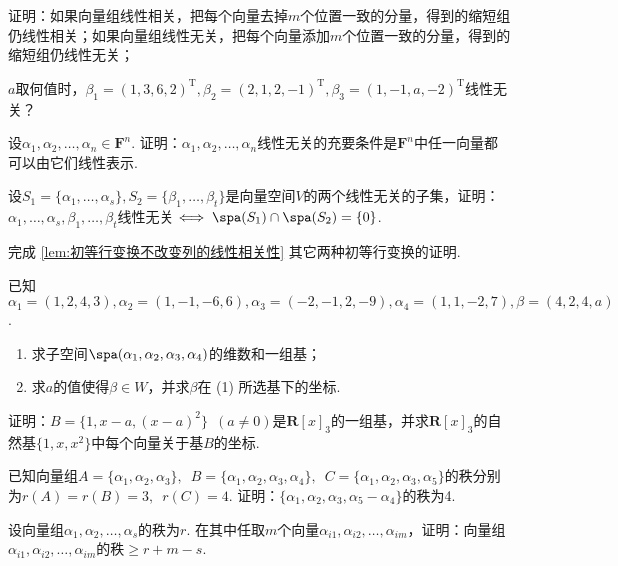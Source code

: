 \begin{exercise}
\begin{exgroup}
\begin{enumerate}
        \end{enumerate}

        \item 证明：如果向量组线性相关，把每个向量去掉$m$个位置一致的分量，得到的缩短组仍线性相关；如果向量组线性无关，把每个向量添加$m$个位置一致的分量，得到的缩短组仍线性无关；

        \item $a$取何值时，$\beta_1=(1,3,6,2)^\mathrm{T},\beta_2=(2,1,2,-1)^\mathrm{T},\beta_3=(1,-1,a,-2)^\mathrm{T}$线性无关？

        \item 设$\alpha_1,\alpha_2,\ldots,\alpha_n\in\mathbf{F}^n$. 证明：$\alpha_1,\alpha_2,\ldots,\alpha_n$线性无关的充要条件是$\mathbf{F}^n$中任一向量都可以由它们线性表示.

        \item 设$S_1=\{\alpha_1,\ldots,\alpha_s\},S_2=\{\beta_1,\ldots,\beta_t\}$是向量空间$V$的两个线性无关的子集，证明：$\alpha_1,\ldots,\alpha_s,\beta_1,\ldots,\beta_t$线性无关$\iff \spa(S_1)\cap \spa(S_2)=\{0\}$.

        \item 完成 \autoref{lem:初等行变换不改变列的线性相关性} 其它两种初等行变换的证明.

        \item 已知$\alpha_1=(1,2,4,3),\alpha_2=(1,-1,-6,6),\alpha_3=(-2,-1,2,-9),\alpha_4=(1,1,-2,7),\beta=(4,2,4,a)$.
        \begin{enumerate}
            \item 求子空间$\spa(\alpha_1,\alpha_2,\alpha_3,\alpha_4)$的维数和一组基；

            \item 求$a$的值使得$\beta\in W$，并求$\beta$在 (1) 所选基下的坐标.
        \end{enumerate}

        \item 证明：$B=\{1,x-a,(x-a)^2\}\enspace(a\neq 0)$是$\mathbf{R}[x]_3$的一组基，并求$\mathbf{R}[x]_3$的自然基$\{1,x,x^2\}$中每个向量关于基$B$的坐标.

        \item 已知向量组$A=\{\alpha_1,\alpha_2,\alpha_3\},\enspace B=\{\alpha_1,\alpha_2,\alpha_3,\alpha_4\},\enspace C=\{\alpha_1,\alpha_2,\alpha_3,\alpha_5\}$的秩分别为$r(A)=r(B)=3,\enspace r(C)=4$. 证明：$\{\alpha_1,\alpha_2,\alpha_3,\alpha_5-\alpha_4\}$的秩为4.

        \item 设向量组$\alpha_1,\alpha_2,\ldots,\alpha_s$的秩为$r$. 在其中任取$m$个向量$\alpha_{i1},\alpha_{i2},\ldots,\alpha_{im}$，证明：向量组$\alpha_{i1},\alpha_{i2},\ldots,\alpha_{im}$的秩$\geqslant r+m-s$.


\end{exgroup}
\end{exercise}
